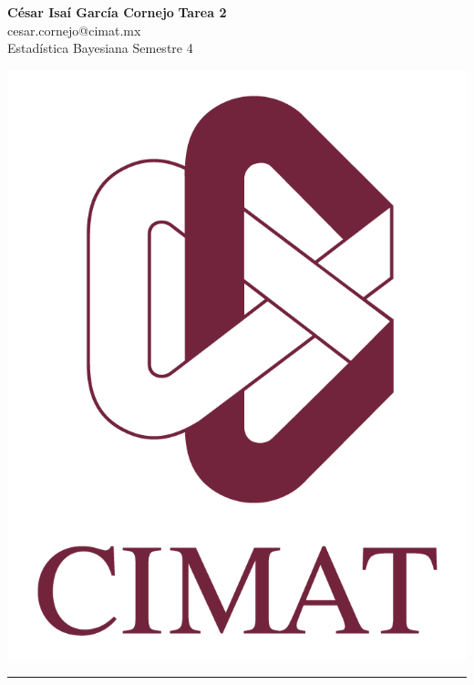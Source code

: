 \documentclass[a4paper, 11pt]{article}
\begin{document}
	\noindent
	
	\begin{minipage}[b][1.2cm][t]{0.8\textwidth}
		\large\textbf{César Isaí García Cornejo} \hfill \textbf{Tarea 2}  \\
		cesar.cornejo@cimat.mx \hfill \\
		\normalsize Estadística Bayesiana \hfill Semestre 4\\
	\end{minipage}
	
	\hspace{14.4cm}
	\begin{minipage}[b][0.03cm][t]{0.12\linewidth}
		
		\vspace{-2.2cm}
		\includegraphics[scale=0.3]{Figures/EscudoCimat.png}
	\end{minipage}
	
	\noindent\rule{7in}{2.8pt}
	
\end{document}
